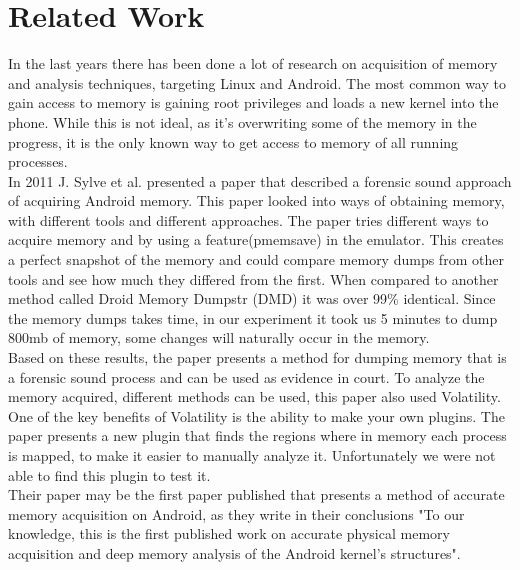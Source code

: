 \section{Related Work}
In the last years there has been done a lot of research on acquisition of memory
and analysis techniques, targeting Linux and Android. The most common way to 
gain access to memory is gaining root privileges and loads a new kernel into the 
phone. While this is not ideal, as it’s overwriting some of the memory in the 
progress, it is the only known way to get access to memory of all running processes.\\

In 2011 J. Sylve et al. presented a paper that described a forensic sound 
approach of acquiring Android memory. \cite{acq_vol_android_mem} This paper looked 
into ways of obtaining memory, with different tools and different approaches. The paper 
tries different ways to acquire memory and by using a feature(pmemsave) in the emulator. 
This creates a perfect snapshot of the memory and could compare memory dumps from other 
tools and see how much they differed from the first. When compared to another method 
called Droid Memory Dumpstr (DMD) it was over 99\% identical. Since the memory dumps 
takes time, in our experiment it took us 5 minutes to dump 800mb of memory, some 
changes will naturally occur in the memory.\\

Based on these results, the paper presents a method for dumping memory that is a 
forensic sound process and can be used as evidence in court. To analyze the memory 
acquired, different methods can be used, this paper also used Volatility.
One of the key benefits of Volatility is the ability to make your 
own plugins. The paper presents a new plugin that finds the regions where in memory 
each process is mapped, to make it easier to manually analyze it. Unfortunately we were not 
able to find this plugin to test it.\\

Their paper may be the first paper published that presents a method of accurate memory acquisition on
Android, as they write in their conclusions "To our knowledge, this is the first published work on
accurate physical memory acquisition and deep memory analysis of the Android kernel's structures".
